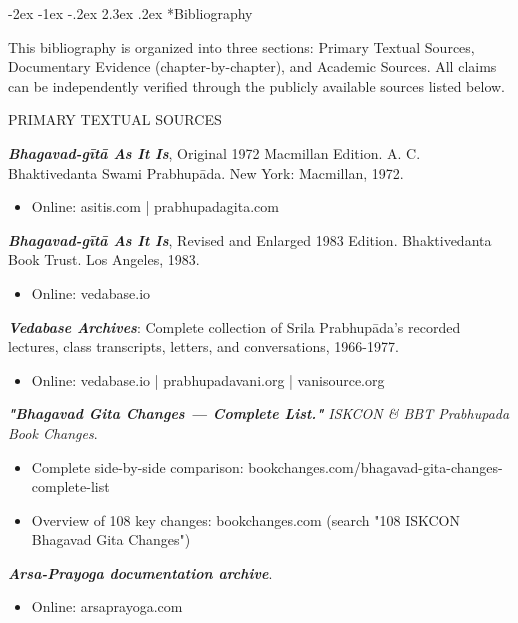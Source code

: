 \documentclass[12pt,twoside]{book}
\makeatletter
\renewcommand\section{\@startsection{section}{1}{\z@}%
{-3.5ex \@plus -1ex \@minus -.2ex}%
{2.3ex \@plus.2ex}%
{\normalfont\Large\bfseries}}
\let\oldsection\section
\renewcommand{\section}[1]{\needspace{4\baselineskip}\oldsection{#1}}
\def\cleardoublepage{\clearpage\if@twoside \ifodd\c@page\else\hbox{}\thispagestyle{empty}\newpage\if@twocolumn\hbox{}\newpage\fi\fi\fi}
\renewcommand\section{\@startsection{section}{1}{\z@}%
{-2ex \@plus -1ex \@minus -.2ex}%
{2.3ex \@plus.2ex}%
{\normalfont\Large\bfseries}}
\makeatother
\begin{document}
\cleardoublepage
\vspace*{0.15\textheight}
\section*{Bibliography}
\thispagestyle{sectionopening}

This bibliography is organized into three sections: Primary Textual Sources, Documentary Evidence (chapter-by-chapter), and Academic Sources. All claims can be independently verified through the publicly available sources listed below.

\vspace{0.5cm}

PRIMARY TEXTUAL SOURCES

\vspace{0.1cm}

\textbf{\emph{Bhagavad-gītā As It Is}}, Original 1972 Macmillan Edition. A. C. Bhaktivedanta Swami Prabhupāda. New York: Macmillan, 1972.
\begin{itemize}
\item Online: asitis.com | prabhupadagita.com
\end{itemize}

\textbf{\emph{Bhagavad-gītā As It Is}}, Revised and Enlarged 1983 Edition. Bhaktivedanta Book Trust. Los Angeles, 1983.
\begin{itemize}
\item Online: vedabase.io
\end{itemize}

\textbf{\emph{Vedabase Archives}}: Complete collection of Srila Prabhupāda's recorded lectures, class transcripts, letters, and conversations, 1966-1977.
\begin{itemize}
\item Online: vedabase.io | prabhupadavani.org | vanisource.org
\end{itemize}

\textbf{\emph{"Bhagavad Gita Changes — Complete List."}} \emph{ISKCON \& BBT Prabhupada Book Changes}.
\begin{itemize}
\item Complete side-by-side comparison: bookchanges.com/bhagavad-gita-changes-complete-list
\item Overview of 108 key changes: bookchanges.com (search "108 ISKCON Bhagavad Gita Changes")
\end{itemize}

\textbf{\emph{Arsa-Prayoga documentation archive}}.
\begin{itemize}
\item Online: arsaprayoga.com
\end{itemize}
\end{document}

